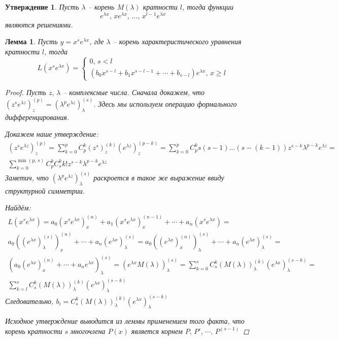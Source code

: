 \documentclass[a4paper,12pt]{article}
\renewcommand{\geq}{\ensuremath{\geqslant}}
\theoremstyle{plain}
\newtheorem{lemma}{Лемма}[section]
\newtheorem{proposition}{Утверждение}[section]
\theoremstyle{definition}
\theoremstyle{remark}
\begin{document}
\begin{proposition}
	Пусть $\lambda$ -- корень $M(\lambda)$ кратности $l$, тогда функции
	\[e^{\lambda x},\, xe^{\lambda x},\,\ldots,\, x^{l - 1}e^{\lambda x}\] являются решениями.
\end{proposition}

\begin{lemma}
	Пусть $y = x^se^{\lambda x}$, где $\lambda$ -- корень характеристического уравнения кратности $l$, тогда
	\[L(x^se^{\lambda x}) = \begin{cases}
			0,\, s < l \\
			(b_0x^{s-l} + b_1x^{s-l-1}+\cdots+b_{s-l})e^{\lambda x},\, x \geq l
		\end{cases}\]

	\begin{proof}
		Пусть $z,\, \lambda$ -- комплексные числа. Сначала докажем, что $(z^se^{\lambda z})^{(p)}_z = (\lambda^pe^{\lambda z})^{(s)}_\lambda$. Здесь мы используем операцию формального дифференцирования.

		Докажем наше утверждение:
		\begin{align*}
			(z^se^{\lambda z})^{(p)}_z = \sum_{k=0}^p C_p^k (z^s)_z^{(k)}(e^{\lambda z})_z^{(p - k)} = \sum_{k = 0}^p C_p^k s(s-1)\ldots(s - (k - 1))z^{s - k}\lambda^{p-k}e^{\lambda z} = \\
			\sum_{k = 0}^{\min(p,\,s)} C_p^k C_s^k k! z^{s - k}\lambda^{p-k}e^{\lambda z}
		\end{align*}
		Заметич, что $(\lambda^pe^{\lambda z})^{(s)}_\lambda$ раскроется в такое же выражение ввиду структурной симметрии.

		Найдём:
		\begin{align*}
			L(x^se^{\lambda x}) = a_0(x^se^{\lambda x})^{(n)}_x + a_1(x^se^{\lambda x})^{(n-1)}_x + \cdots + a_n(x^se^{\lambda x}) =                                                                             \\
			a_0 ((e^{\lambda x})^{(s)}_\lambda)^{(n)}_x + \cdots + a_n (e^{\lambda x})^{(s)}_\lambda = a_0((e^{\lambda x})^{(n)}_x)^{(s)}_\lambda + \cdots + a_n(e^{\lambda x})^{(s)}_\lambda =                  \\
			(a_0(e^{\lambda x})^{(n)}_x + \cdots + a_ne^{\lambda x})^{(s)}_\lambda = (e^{\lambda x}M(\lambda))^{(s)}_\lambda = \sum_{k = 0}^s C_s^k(M(\lambda))_\lambda^{(k)}(e^{\lambda x})^{(s - k)}_\lambda = \\
			\sum_{k = l}^s C_s^k(M(\lambda))_\lambda^{(k)}(e^{\lambda x})^{(s - k)}_\lambda
		\end{align*}
		Следовательно, $b_i = C_s^k(M(\lambda))^{(k)}_\lambda(e^{\lambda x})^{(s-k)}_\lambda$

		Исходное утверждение выводится из леммы применением того факта, что корень кратности $s$ многочлена $P(x)$ является корнем $P,\,P',\,\cdots,\,P^{(s-1)}$
	\end{proof}
\end{lemma}
\end{document}
